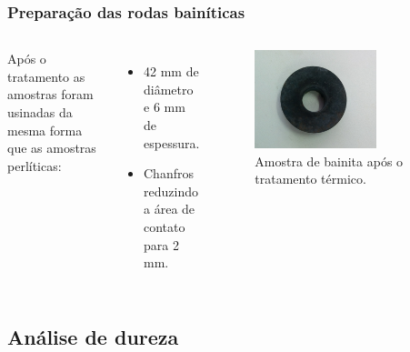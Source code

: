 \documentclass{beamer}
\begin{document}
\begin{frame}
\frametitle{Preparação das rodas bainíticas}

\begin{columns}[c] %
	Após o tratamento as amostras foram usinadas da mesma forma que as amostras perlíticas:
	\begin{itemize}
		\item 42 mm de diâmetro e 6 mm de espessura.
		\item Chanfros reduzindo a área de contato para 2 mm.
	\end{itemize}
	
	\begin{figure}
		\centering
		\includegraphics[width=0.7\textwidth]{amostra_bainita}
		\caption{Amostra de bainita após o tratamento térmico.}
		\label{fig:amostra_bainita}
	\end{figure}
\end{columns}

	

\end{frame}



\subsection{Análise de dureza}
\end{document}
